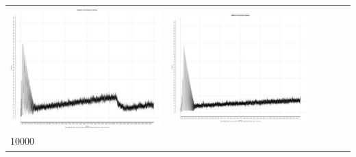 \begin{table}[htbp]
{\begin{tabular}{l | ccccc}
\begin{minipage}{.15\textwidth}
     			 	\includegraphics[width=\linewidth]{images/mema-triple/N11}
    				 \end{minipage}
    			   &	 \begin{minipage}{.15\textwidth}\vspace{2pt}     							
     			 	\includegraphics[width=\linewidth]{images/mema-triple/N13}
    				 \end{minipage}\\
		10000  &	 \begin{minipage}{.15\textwidth}\vspace{2pt}     							

\end{minipage}
\end{tabular}}
\end{table}
